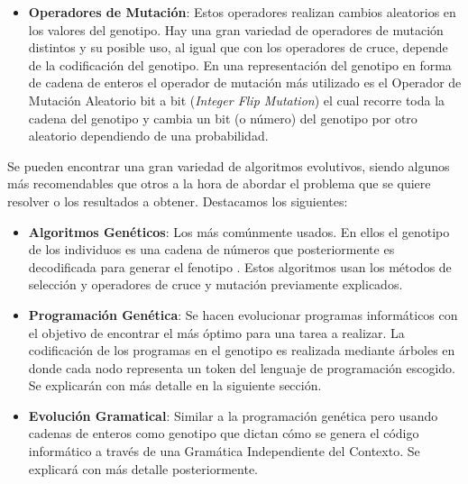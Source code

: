 \begin{itemize}
\item \textbf{Operadores de Mutación}: Estos operadores realizan cambios aleatorios en los valores del genotipo. Hay una gran variedad de operadores de mutación distintos y su posible uso, al igual que con los operadores de cruce, depende de la codificación del genotipo. En una representación del genotipo en forma de cadena de enteros el operador de mutación más utilizado es el Operador de Mutación Aleatorio bit a bit (\textit{Integer Flip Mutation}) el cual recorre toda la cadena del genotipo y cambia un bit (o número) del genotipo por otro aleatorio dependiendo de una probabilidad.
\end{itemize}

Se pueden encontrar una gran variedad de algoritmos evolutivos, siendo algunos más recomendables que otros a la hora de abordar el problema que se quiere resolver o los resultados a obtener. Destacamos los siguientes:
\begin{itemize}
\item \textbf{Algoritmos Genéticos}: Los más comúnmente usados. En ellos el genotipo de los individuos es una cadena de números que posteriormente es decodificada para generar el fenotipo \cite{cervigon09}. Estos algoritmos usan los métodos de selección y operadores de cruce y mutación previamente explicados. 

\item \textbf{Programación Genética}: Se hacen evolucionar programas informáticos con el objetivo de encontrar el más óptimo para una tarea a realizar. La codificación de los programas en el genotipo es realizada mediante árboles en donde cada nodo representa un token del lenguaje de programación escogido. Se explicarán con más detalle en la siguiente sección.

\item \textbf{Evolución Gramatical}: Similar a la programación genética pero usando cadenas de enteros como genotipo que dictan cómo se genera el código informático a través de una Gramática Independiente del Contexto. Se explicará con más detalle posteriormente.
\end{itemize}

